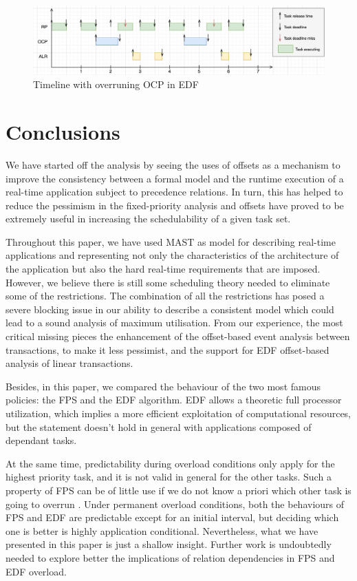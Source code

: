 \documentclass{article}
\begin{document}
\begin{figure}[!htbp]
\centering
\includegraphics[width=6.5in]{images/timeline-overload-edf-ocp}
\caption{Timeline with overruning OCP in EDF}
\label{timeline-overload-edf-ocp}
\end{figure}

\section{Conclusions}

We have started off the analysis by seeing the uses of offsets as a mechanism to improve the consistency between a formal model and the runtime execution of a real-time application subject to precedence relations. In turn, this has helped to reduce the pessimism in the fixed-priority analysis and offsets have proved to be extremely useful in increasing the schedulability of a given task set.

Throughout this paper, we have used MAST as model for describing real-time applications and representing not only the characteristics of the architecture of the application but also the hard real-time requirements that are imposed. However, we believe there is still some scheduling theory needed to eliminate some of the restrictions. The combination of all the restrictions has posed a severe blocking issue in our ability to describe a consistent model which could lead to a sound analysis of maximum utilisation. From our experience, the most critical missing pieces the enhancement of the offset-based event analysis between transactions, to make it less pessimist, and the support for EDF offset-based analysis of linear transactions.

Besides, in this paper, we compared the behaviour of the two most famous policies: the FPS and the EDF algorithm. EDF allows a theoretic full processor utilization, which implies a more efficient exploitation of computational resources, but the statement doesn't hold in general with applications composed of dependant tasks.

At the same time, predictability during overload conditions only apply for the highest priority task, and it is not valid in general for the other tasks. Such a property of FPS can be of little use if we do not know a priori which other task is going to overrun \cite{buttazzo-rm-edf}. Under permanent overload conditions, both the behaviours of FPS and EDF are predictable except for an initial interval, but deciding which one is better is highly application conditional. Nevertheless, what we have presented in this paper is just a shallow insight. Further work is undoubtedly needed to explore better the implications of relation dependencies in FPS and EDF overload.
\end{document}
